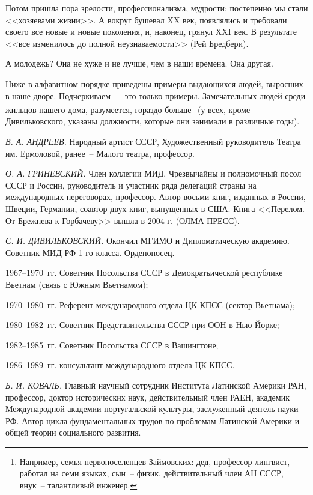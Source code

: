 Потом пришла пора зрелости, профессионализма, мудрости; постепенно мы стали <<хозяевами жизни>>. А вокруг бушевал XX век, появлялись и требовали своего все новые и новые поколения, и, наконец, грянул XXI век. В результате <<все изменилось до полной неузнаваемости>> (Рей Бредбери).

А молодежь? Она не хуже и не лучше, чем в наши времена. Она другая.

\newpage


Ниже в алфавитном порядке приведены примеры выдающихся людей, выросших в наше дворе. Подчеркиваем ~-- это только примеры. Замечательных людей среди жильцов нашего дома, разумеется, гораздо больше\footnote{Например, семья первопоселенцев Займовских: дед, профессор-лингвист, работал на семи языках, сын~-- физик, действительный член АН СССР, внук~-- талантливый инженер.} (у всех, кроме Дивильковского, указаны должности, которые они занимали в различные годы).

\textit{В. А. АНДРЕЕВ.} Народный артист СССР, Художественный руководитель Театра им. Ермоловой, ранее~-- Малого театра, профессор.

\textit{О. А. ГРИНЕВСКИЙ.} Член коллегии МИД, Чрезвычайны и полномочный посол СССР и России, руководитель и участник ряда делегаций страны на международных переговорах, профессор. Автор восьми книг, изданных в России, Швеции, Германии, соавтор двух книг, выпущенных в США. Книга <<Перелом. От Брежнева к Горбачеву>> вышла в 2004 г. (ОЛМА-ПРЕСС).

\textit{С. И. ДИВИЛЬКОВСКИЙ.} Окончил МГИМО и Дипломатическую академию. Советник МИД РФ 1-го класса. Орденоносец.

1967--1970~гг. Советник Посольства СССР в Демократьической республике Вьетнам (связь с Южным Вьетнамом);

1970--1980~гг. Референт международного отдела ЦК КПСС (сектор Вьетнама);

1980--1982~гг. Советник  Представительства СССР при ООН в Нью-Йорке;

1982--1985~гг. Советник Посольства СССР в Вашингтоне;

1986--1989~гг. консультант международного отдела ЦК КПСС.

\textit{Б. И. КОВАЛЬ.} Главный научный сотрудник Института Латинской Америки РАН, профессор, доктор исторических наук, действительный член РАЕН, академик Международной академии португальской культуры, заслуженный деятель науки РФ. Автор цикла фундаментальных трудов по проблемам Латинской Америки и общей теории социального развития.

